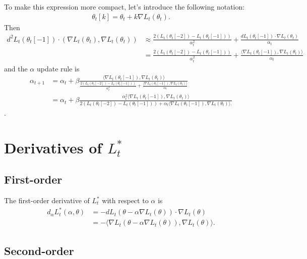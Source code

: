 \documentclass{article}
\begin{document}
To make this expression more compact, let's introduce the following notation:
\begin{align*}
    \theta_t[k] = \theta_t + k \nabla L_t(\theta_t).
\end{align*}
Then
\begin{align*}
    d^2 L_t(\theta_t[-1]) \cdot (\nabla L_t(\theta_t), \nabla L_t(\theta_t))
    &\approx \frac{2
        (L_t(\theta_t[-2])
        - L_t(\theta_t[-1]))}{\alpha_t^2}
        + \frac{dL_t(\theta_t[-1]) \cdot \nabla L_t(\theta_t)}{\alpha_t} \\
    &= \frac{2
        (L_t(\theta_t[-2])
        - L_t(\theta_t[-1]))}{\alpha_t^2}
        + \frac{\langle \nabla L_t(\theta_t[-1]), \nabla L_t(\theta_t) \rangle}{\alpha_t}\end{align*}
and the $\alpha$ update rule is
\begin{align*}
    \alpha_{t+1} &= \alpha_t + \beta
    \frac{\langle \nabla L_t(\theta_t[-1]), \nabla L_t(\theta_t) \rangle}
    {
    \frac{2
    (L_t(\theta_t[-2])
    - L_t(\theta_t[-1]))}{\alpha_t^2}
    + \frac{\langle \nabla L_t(\theta_t[-1]), \nabla L_t(\theta_t) \rangle}{\alpha_t}
    } \\
    &= \alpha_t + \beta
    \frac{\alpha_t^2 \langle \nabla L_t(\theta_t[-1]), \nabla L_t(\theta_t) \rangle}
    {
    2 (L_t(\theta_t[-2])
    - L_t(\theta_t[-1]))
    + \alpha_t \langle \nabla L_t(\theta_t[-1]), \nabla L_t(\theta_t) \rangle.
    }
\end{align*}.


\section{Derivatives of $L_t^*$}

\subsection{First-order}

The first-order derivative of $L_t^*$ with respect to $\alpha$ is
\begin{align*}
    d_\alpha L_t^* (\alpha, \theta)
    &= -d L_t (\theta - \alpha \nabla L_t (\theta)) \cdot \nabla L_t(\theta) \\
    &= -\langle \nabla L_t(\theta - \alpha \nabla L_t (\theta)), \nabla L_t(\theta) \rangle.
\end{align*}

\subsection{Second-order}
\end{document}
